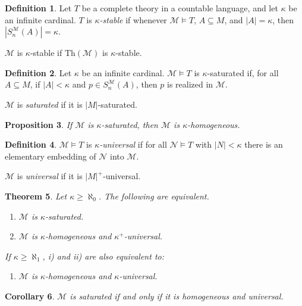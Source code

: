 \documentclass{amsart}
\newtheorem{theorem}{Theorem}[subsection]
\newtheorem{proposition}[theorem]{Proposition}
\newtheorem{corollary}[theorem]{Corollary}
\theoremstyle{definition}
\newtheorem{definition}[theorem]{Definition}
\numberwithin{equation}{section}
\begin{document}
\begin{definition}
  Let $T$ be a complete theory in a countable language,
  and let $\kappa$ be an infinite cardinal.
  $T$ is \emph{$\kappa$-stable} if whenever $\mathcal{M}\models T$,
  $A \subseteq M$, and $|A| = \kappa$, then $|S^{\mathcal{M}}_n(A)| = \kappa$.

  $\mathcal{M}$ is $\kappa$-stable if $\mathrm{Th}(\mathcal{M})$ is $\kappa$-stable.
\end{definition}

\begin{definition}
  Let $\kappa$ be an infinite cardinal.
  $\mathcal{M} \models T$ is $\kappa$-saturated if,
  for all $A \subseteq M$, if $|A| < \kappa$ and $p \in S^{\mathcal{M}}_n(A)$,
  then $p$ is realized in $\mathcal{M}$.

  $\mathcal{M}$ is \emph{saturated} if it is $|M|$-saturated.
\end{definition}

\begin{proposition}
  If $\mathcal{M}$ is $\kappa$-saturated,
  then $\mathcal{M}$ is $\kappa$-homogeneous.
\end{proposition}

\begin{definition}
  $\mathcal{M} \models T$ is \emph{$\kappa$-universal} if for all $\mathcal{N}\models T$ with $|N| < \kappa$ there is an elementary embedding of $\mathcal{N}$ into $\mathcal{M}$.

  $\mathcal{M}$ is \emph{universal} if it is $|M|^+$-universal.
\end{definition}

\begin{theorem}
  Let $\kappa \ge \aleph_0$.
  The following are equivalent.
  \begin{enumerate}[label = {\roman*)}]
    \item $\mathcal{M}$ is $\kappa$-saturated.
    \item $\mathcal{M}$ is $\kappa$-homogeneous and $\kappa^+$-universal.
  \end{enumerate}
  If $\kappa \ge \aleph_1$, i) and ii) are also equivalent to:
  \begin{enumerate}[resume, label = {\roman*)}]
    \item $\mathcal{M}$ is $\kappa$-homogeneous and $\kappa$-universal.
  \end{enumerate}
\end{theorem}

\begin{corollary}
  $\mathcal{M}$ is saturated if and only if it is homogeneous and universal.
\end{corollary}
\end{document}
